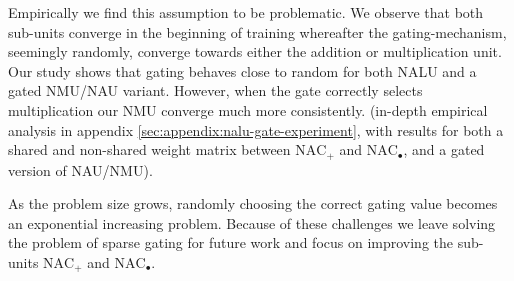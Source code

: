 Empirically we find this assumption to be problematic.
We observe that both sub-units converge in the beginning of training whereafter the gating-mechanism, seemingly randomly, converge towards either the addition or multiplication unit. Our study shows that gating behaves close to random for both NALU and a gated NMU/NAU variant. However, when the gate correctly selects multiplication our NMU converge much more consistently. (in-depth empirical analysis in appendix \ref{sec:appendix:nalu-gate-experiment}, with results for both a shared and non-shared weight matrix between $\text{NAC}_{+}$ and $\text{NAC}_{\bullet}$, and a gated version of NAU/NMU).

As the problem size grows, randomly choosing the correct gating value becomes an exponential increasing problem. Because of these challenges we leave solving the problem of sparse gating for future work and focus on improving the sub-units $\text{NAC}_{+}$ and $\text{NAC}_{\bullet}$.